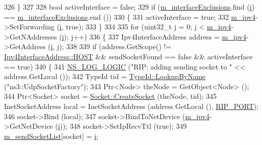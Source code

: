 \begin{DoxyCode}
326     \}
327 
328   \textcolor{keywordtype}{bool} activeInterface = \textcolor{keyword}{false};
329   \textcolor{keywordflow}{if} (\hyperlink{classns3_1_1Rip_a30e2c00645f24a3b29be981f5d592773}{m\_interfaceExclusions}.find (\hyperlink{bernuolliDistribution_8m_a6f6ccfcf58b31cb6412107d9d5281426}{i}) == 
      \hyperlink{classns3_1_1Rip_a30e2c00645f24a3b29be981f5d592773}{m\_interfaceExclusions}.end ())
330     \{
331       activeInterface = \textcolor{keyword}{true};
332       \hyperlink{classns3_1_1Rip_a6e2c0e74d2fa8643d223db26621dd7f1}{m\_ipv4}->SetForwarding (\hyperlink{bernuolliDistribution_8m_a6f6ccfcf58b31cb6412107d9d5281426}{i}, \textcolor{keyword}{true});
333     \}
334 
335   \textcolor{keywordflow}{for} (uint32\_t j = 0; j < \hyperlink{classns3_1_1Rip_a6e2c0e74d2fa8643d223db26621dd7f1}{m\_ipv4}->GetNAddresses (\hyperlink{bernuolliDistribution_8m_a6f6ccfcf58b31cb6412107d9d5281426}{i}); j++)
336     \{
337       Ipv4InterfaceAddress address = \hyperlink{classns3_1_1Rip_a6e2c0e74d2fa8643d223db26621dd7f1}{m\_ipv4}->GetAddress (\hyperlink{bernuolliDistribution_8m_a6f6ccfcf58b31cb6412107d9d5281426}{i}, j);
338 
339       \textcolor{keywordflow}{if} (address.GetScope() != \hyperlink{classns3_1_1Ipv4InterfaceAddress_a329cea433e74f717c26c9e51c4fcd3d8a7276e171c0232cceba24502099750890}{Ipv4InterfaceAddress::HOST} && sendSocketFound == \textcolor{keyword}{
      false} && activeInterface == \textcolor{keyword}{true})
340         \{
341           \hyperlink{group__logging_ga88acd260151caf2db9c0fc84997f45ce}{NS\_LOG\_LOGIC} (\textcolor{stringliteral}{"RIP: adding sending socket to "} << address.GetLocal ());
342           TypeId tid = \hyperlink{classns3_1_1TypeId_a119cf99c20931fdc294602cd360b180e}{TypeId::LookupByName} (\textcolor{stringliteral}{"ns3::UdpSocketFactory"});
343           Ptr<Node> theNode = GetObject<Node> ();
344           Ptr<Socket> socket = \hyperlink{classns3_1_1Socket_ad448a62bb50ad3dbac59c879a885a8d2}{Socket::CreateSocket} (theNode, tid);
345           InetSocketAddress local = InetSocketAddress (address.GetLocal (), 
      \hyperlink{rip_8cc_a6af26a435808c34ee4f8876792a5682a}{RIP\_PORT});
346           socket->Bind (local);
347           socket->BindToNetDevice (\hyperlink{classns3_1_1Rip_a6e2c0e74d2fa8643d223db26621dd7f1}{m\_ipv4}->GetNetDevice (\hyperlink{bernuolliDistribution_8m_a6f6ccfcf58b31cb6412107d9d5281426}{i}));
348           socket->SetIpRecvTtl (\textcolor{keyword}{true});
349           \hyperlink{classns3_1_1Rip_a58b5f6ebcee2ed04249fd025abfa61cb}{m\_sendSocketList}[socket] = \hyperlink{bernuolliDistribution_8m_a6f6ccfcf58b31cb6412107d9d5281426}{i};

\end{DoxyCode}
